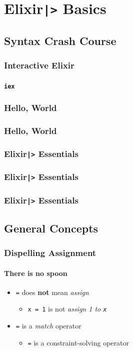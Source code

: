 \documentclass[english]{beamer}
\begin{document}
\section{Elixir\texttt{|>} Basics}

\subsection{Syntax Crash Course}
\begin{frame}[fragile]
\frametitle{Interactive Elixir}
\framesubtitle{\texttt{iex}}

\end{frame}

\begin{frame}[fragile]
\frametitle{Hello, World}

\end{frame}

\begin{frame}[fragile]
\frametitle{Hello, World}

\end{frame}

\begin{frame}[fragile]
\frametitle{Elixir\texttt{|>} Essentials}

\end{frame}

\begin{frame}[fragile]
\frametitle{Elixir\texttt{|>} Essentials}

\end{frame}

\begin{frame}[fragile]
\frametitle{Elixir\texttt{|>} Essentials}

\end{frame}

\subsection{General Concepts}
\begin{frame}
\frametitle{Dispelling Assignment}
\framesubtitle{There is no spoon}
\begin{itemize}
\item{\texttt{=} does \textbf{not} mean \textit{assign}}
\begin{itemize}
\item{\texttt{x = 1} is not \textit{assign 1 to \texttt{x}}}
\end{itemize}
\item{\texttt{=} is a \textit{match} operator}
\begin{itemize}
\item{\texttt{=} is a constraint-solving operator}
\end{itemize}
\end{itemize}
\end{frame}
\end{document}
